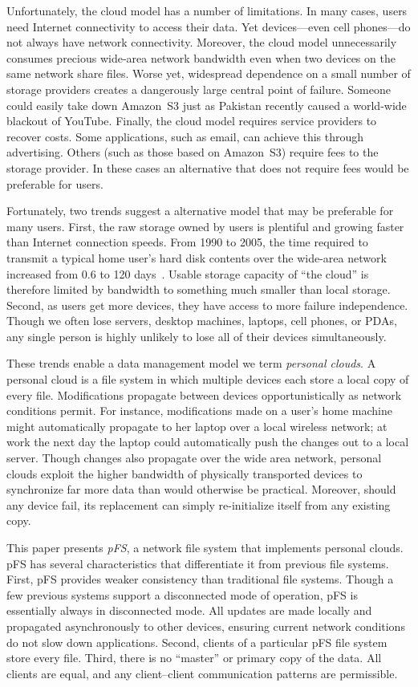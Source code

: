 Unfortunately, the cloud model has a number of limitations.  In many
cases, users need Internet connectivity to access their data.  Yet
devices---even cell phones---do not always have network connectivity.
Moreover, the cloud model unnecessarily consumes precious wide-area
network bandwidth even when two devices on the same network share
files.  Worse yet, widespread dependence on a small number of storage
providers creates a dangerously large central point of failure.
Someone could easily take down Amazon~S3 just as Pakistan recently
caused a world-wide blackout of YouTube.  Finally, the cloud model
requires service providers to recover costs.  Some applications, such
as email, can achieve this through advertising.  Others (such as those
based on Amazon~S3) require fees to the storage provider.  In these
cases an alternative that does not require fees would be preferable
for users.

Fortunately, two trends suggest a alternative model that may be
preferable for many users.  First, the raw storage owned by users is
plentiful and growing faster than Internet connection speeds.  From
1990 to 2005, the time required to transmit a typical home user's hard
disk contents over the wide-area network increased from 0.6 to 120
days~\cite{rodrigues:multi-hop}.  Usable storage capacity of ``the
cloud'' is therefore limited by bandwidth to something much smaller
than local storage.  Second, as users get more devices, they have
access to more failure independence.  Though we often lose servers,
desktop machines, laptops, cell phones, or PDAs, any single person is
highly unlikely to lose all of their devices simultaneously.

These trends enable a data management model we term \emph{personal
  clouds}.  A personal cloud is a file system in which multiple
devices each store a local copy of every file.  Modifications
propagate between devices opportunistically as network conditions
permit.  For instance, modifications made on a user's home machine
might automatically propagate to her laptop over a local wireless
network; at work the next day the laptop could automatically push the
changes out to a local server.  Though changes also propagate over the
wide area network, personal clouds exploit the higher bandwidth of
physically transported devices to synchronize far more data than would
otherwise be practical.  Moreover, should any device fail, its
replacement can simply re-initialize itself from any existing copy.

This paper presents \emph{pFS}, a network file system that implements
personal clouds.  pFS has several characteristics that differentiate
it from previous file systems.  First, pFS provides weaker consistency
than traditional file systems.  Though a few previous systems support
a disconnected mode of operation, pFS is essentially always in
disconnected mode.  All updates are made locally and propagated
asynchronously to other devices, ensuring current network conditions
do not slow down applications.  Second, clients of a particular pFS
file system store every file.  Third, there is no ``master'' or
primary copy of the data.  All clients are equal, and any
client--client communication patterns are permissible.

